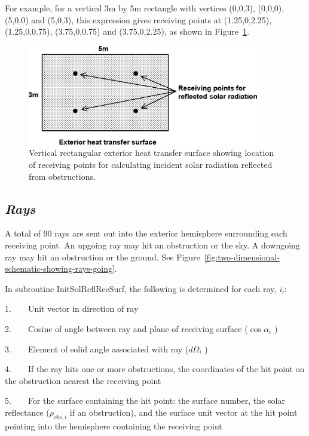For example, for a vertical 3m by 5m rectangle with vertices (0,0,3), (0,0,0), (5,0,0) and (5,0,3), this expression gives receiving points at (1.25,0,2.25), (1.25,0,0.75), (3.75,0,0.75) and (3.75,0,2.25), as shown in Figure~\ref{fig:vertical-rectangular-exterior-heat-transfer}.

\begin{figure}[hbtp] %
\centering
\includegraphics[width=0.9\textwidth, height=0.9\textheight, keepaspectratio=true]{media/image676.png}
\caption{Vertical rectangular exterior heat transfer surface showing location of receiving points for calculating incident solar radiation reflected from obstructions. \protect \label{fig:vertical-rectangular-exterior-heat-transfer}}
\end{figure}

\subsection{\emph{Rays}}\label{rays}

A total of 90 rays are sent out into the exterior hemisphere surrounding each receiving point. An upgoing ray may hit an obstruction or the sky. A downgoing ray may hit an obstruction or the ground. See Figure~\ref{fig:two-dimensional-schematic-showing-rays-going}.

In subroutine InitSolReflRecSurf, the following is determined for each ray, \emph{i,}:

1.~~~~Unit vector in direction of ray

2.~~~~Cosine of angle between ray and plane of receiving surface (\(\cos {\alpha_i}\) )

3.~~~~Element of solid angle associated with ray (\(d{\Omega_i}\) )

4.~~~~If the ray hits one or more obstructions, the coordinates of the hit point on the obstruction nearest the receiving point

5.~~~~For the surface containing the hit point: the surface number, the solar reflectance (\({\rho_{obs,i}}\) if an obstruction), and the surface unit vector at the hit point pointing into the hemisphere containing the receiving point

